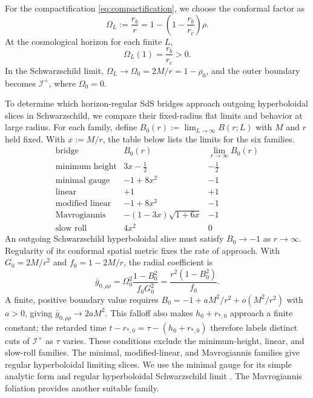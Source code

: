 \documentclass[
 aps,
 prd,
 reprint,
 superscriptaddress,
 nofootinbib,
 longbibliography
]{revtex4-2}
\newcommand{\scri}{\mathscr{I}}
\begin{document}
For the compactification \eqref{eq:compactification}, we choose the conformal factor as
\begin{equation}
 \Omega_L:=\frac{r_b}{r}
 =1-\left(1-\frac{r_b}{r_c}\right)\rho .
 \label{eq:conformal_factor}
\end{equation}
At the cosmological horizon for each finite $L$,
\begin{equation}
 \Omega_L(1)=\frac{r_b}{r_c}>0.
 \label{eq:finite_L_conformal_factor}
\end{equation}
In the Schwarzschild limit,
$\Omega_L\to\Omega_0=2M/r=1-\rho_0$, and the outer boundary becomes
$\scri^+$, where $\Omega_0=0$.

To determine which horizon-regular SdS bridges approach outgoing hyperboloidal slices in Schwarzschild, we compare their fixed-radius flat
limits and behavior at large radius.
For each family, define $B_0(r):=\lim_{L\to\infty}B(r;L)$ with $M$ and $r$ held fixed. With $x:=M/r$, the table below lists
the limits for the six families.
\begin{equation}
\begin{array}{lcc}
\text{bridge}&B_0(r)&\displaystyle\lim_{r\to\infty}B_0(r)\\[1ex]
\hline
\text{minimum height}&3x-\tfrac12&-\tfrac12\\
\text{minimal gauge}&-1+8x^2&-1\\
\text{linear}&+1&+1\\
\text{modified linear}&-1+8x^2&-1\\
\text{Mavrogiannis}&-(1-3x)\sqrt{1+6x}&-1\\
\text{slow roll}&4x^2&0
\end{array}
\label{eq:boost_limits}
\end{equation}
An outgoing Schwarzschild hyperboloidal slice must satisfy $B_0\to-1$ as
$r\to\infty$.  Regularity of its conformal spatial metric fixes the rate
of approach.  With $G_0=2M/r^2$ and $f_0=1-2M/r$, the radial coefficient is
\begin{equation}
 \bar g_{0,\rho\rho}
 =\Omega_0^2\frac{1-B_0^2}{f_0G_0^2}
 =\frac{r^2(1-B_0^2)}{f_0}.
 \label{eq:conformal_spatial_limit}
\end{equation}
A finite, positive boundary value requires
$B_0=-1+aM^2/r^2+o(M^2/r^2)$ with $a>0$, giving
$\bar g_{0,\rho\rho}\to2aM^2$.
This falloff also makes $h_0+r_{*,0}$ approach a finite constant; the
retarded time $t-r_{*,0}=\tau-(h_0+r_{*,0})$ therefore labels distinct cuts
of $\scri^+$ as $\tau$ varies.
These conditions exclude the minimum-height, linear, and slow-roll
families.  The minimal, modified-linear, and Mavrogiannis families give
regular hyperboloidal limiting slices.
We use the minimal gauge for its simple analytic form and regular
hyperboloidal Schwarzschild limit
\cite{PanossoMacedo:2023qzp,ZhouPanossoMacedo:2025}.
The Mavrogiannis foliation provides another
suitable family.
\end{document}
